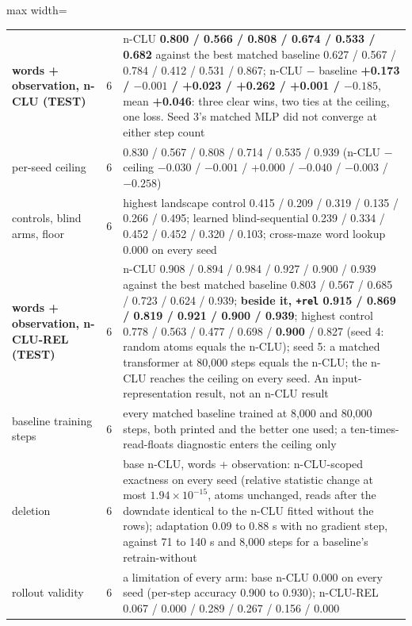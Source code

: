 \documentclass{article} %
\newcommand{\sci}[2]{\ensuremath{#1\times10^{#2}}}
\begin{document}
\begin{table}[h]
\begin{adjustbox}{max width=\linewidth}
\begin{tabular}{p{2.2cm}p{0.6cm}p{10.3cm}}
\midrule
\textbf{words + observation, n-CLU (TEST)} & 6 & n-CLU \textbf{0.800 / 0.566 / 0.808 / 0.674 / 0.533 / 0.682} against the best matched baseline 0.627 / 0.567 / 0.784 / 0.412 / 0.531 / 0.867; n-CLU $-$ baseline \textbf{+0.173 / $-0.001$ / +0.023 / +0.262 / +0.001 / $-0.185$}, mean \textbf{+0.046}: three clear wins, two ties at the ceiling, one loss. Seed 3's matched MLP did not converge at either step count \\
\quad per-seed ceiling & 6 & 0.830 / 0.567 / 0.808 / 0.714 / 0.535 / 0.939 (n-CLU $-$ ceiling $-0.030$ / $-0.001$ / +0.000 / $-0.040$ / $-0.003$ / $-0.258$) \\
\quad controls, blind arms, floor & 6 & highest landscape control 0.415 / 0.209 / 0.319 / 0.135 / 0.266 / 0.495; learned blind-sequential 0.239 / 0.334 / 0.452 / 0.452 / 0.320 / 0.103; cross-maze word lookup 0.000 on every seed \\
\textbf{words + observation, n-CLU-REL (TEST)} & 6 & n-CLU 0.908 / 0.894 / 0.984 / 0.927 / 0.900 / 0.939 against the best matched baseline 0.803 / 0.567 / 0.685 / 0.723 / 0.624 / 0.939; \textbf{beside it, \texttt{+rel} 0.915 / 0.869 / 0.819 / 0.921 / 0.900 / 0.939}; highest control 0.778 / 0.563 / 0.477 / 0.698 / \textbf{0.900} / 0.827 (seed 4: random atoms equals the n-CLU); seed 5: a matched transformer at 80,000 steps equals the n-CLU; the n-CLU reaches the ceiling on every seed. An input-representation result, not an n-CLU result \\
\midrule
baseline training steps & 6 & every matched baseline trained at 8,000 and 80,000 steps, both printed and the better one used; a ten-times-read-floats diagnostic enters the ceiling only \\
deletion & 6 & base n-CLU, words + observation: n-CLU-scoped exactness on every seed (relative statistic change at most \sci{1.94}{-15}, atoms unchanged, reads after the downdate identical to the n-CLU fitted without the rows); adaptation 0.09 to 0.88 s with no gradient step, against 71 to 140 s and 8,000 steps for a baseline's retrain-without \\
rollout validity & 6 & a limitation of every arm: base n-CLU 0.000 on every seed (per-step accuracy 0.900 to 0.930); n-CLU-REL 0.067 / 0.000 / 0.289 / 0.267 / 0.156 / 0.000 \\
\bottomrule
\end{tabular}\end{adjustbox}
\end{table}
\end{document}
